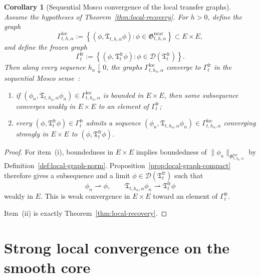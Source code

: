 \documentclass[11pt,a4paper]{amsart}
\theoremstyle{plain}
\newtheorem{corollary}[theorem]{Corollary}
\theoremstyle{definition}
\theoremstyle{remark}
\begin{document}
\begin{corollary}[Sequential Mosco convergence of the local transfer graphs]
\label{cor:local-mosco}
Assume the hypotheses of Theorem~\ref{thm:local-recovery}. For \(h>0\), define the graph
\[
\Gamma_{t,h,\alpha}^{\mathrm{loc}}
:=
\left\{
(\phi,\mathfrak T_{t,h,\alpha}\phi):
\phi\in \mathfrak G_{t,h,\alpha}^{\mathrm{near}}
\right\}
\subset E\times E,
\]
and define the frozen graph
\[
\Gamma_t^{\mathrm{fr}}
:=
\left\{
(\phi,\mathfrak T_t^{\mathrm{fr}}\phi):
\phi\in \mathcal D(\mathfrak T_t^{\mathrm{fr}})
\right\}.
\]
Then along every sequence \(h_n\downarrow0\), the graphs
\(\Gamma_{t,h_n,\alpha}^{\mathrm{loc}}\) converge to \(\Gamma_t^{\mathrm{fr}}\) in the sequential
Mosco sense~\cite{Mosco69}:
\begin{enumerate}[label=(\roman*)]
\item if \((\phi_n,\mathfrak T_{t,h_n,\alpha}\phi_n)\in \Gamma_{t,h_n,\alpha}^{\mathrm{loc}}\) is
bounded in \(E\times E\), then some subsequence converges weakly in \(E\times E\) to an element
of \(\Gamma_t^{\mathrm{fr}}\);
\item every \((\phi,\mathfrak T_t^{\mathrm{fr}}\phi)\in \Gamma_t^{\mathrm{fr}}\) admits a sequence
\((\phi_n,\mathfrak T_{t,h_n,\alpha}\phi_n)\in \Gamma_{t,h_n,\alpha}^{\mathrm{loc}}\) converging
strongly in \(E\times E\) to \((\phi,\mathfrak T_t^{\mathrm{fr}}\phi)\).
\end{enumerate}
\end{corollary}

\begin{proof}
For item~(i), boundedness in \(E\times E\) implies boundedness of
\(\|\phi_n\|_{\mathfrak G_{t,h_n,\alpha}^{\mathrm{loc}}}\) by
Definition~\ref{def:local-graph-norm}. Proposition~\ref{prop:local-graph-compact} therefore
gives a subsequence and a limit \(\phi\in\mathcal D(\mathfrak T_t^{\mathrm{fr}})\) such that
\[
\phi_n\rightharpoonup \phi,
\qquad
\mathfrak T_{t,h_n,\alpha}\phi_n\rightharpoonup \mathfrak T_t^{\mathrm{fr}}\phi
\]
weakly in \(E\). This is weak convergence in \(E\times E\) toward an element of
\(\Gamma_t^{\mathrm{fr}}\).

Item~(ii) is exactly Theorem~\ref{thm:local-recovery}.
\end{proof}

\section{Strong local convergence on the smooth core}\label{sec:smooth-core}
\end{document}

